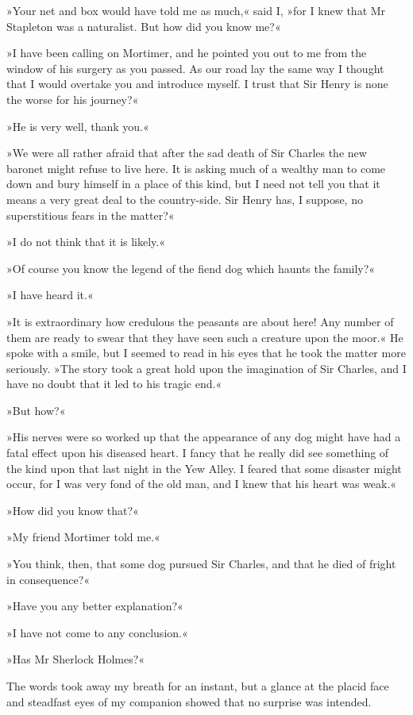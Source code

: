 »Your net and box would have told me as much,« said I, »for I knew that Mr Stapleton was a naturalist. But how did you know me?«

»I have been calling on Mortimer, and he pointed you out to me from the window of his surgery as you passed. As our road lay the same way I thought that I would overtake you and introduce myself. I trust that Sir Henry is none the worse for his journey?«

»He is very well, thank you.«

»We were all rather afraid that after the sad death of Sir Charles the new baronet might refuse to live here. It is asking much of a wealthy man to come down and bury himself in a place of this kind, but I need not tell you that it means a very great deal to the country-side. Sir Henry has, I suppose, no superstitious fears in the matter?«

»I do not think that it is likely.«

»Of course you know the legend of the fiend dog which haunts the family?«

»I have heard it.«

»It is extraordinary how credulous the peasants are about here! Any number of them are ready to swear that they have seen such a creature upon the moor.« He spoke with a smile, but I seemed to read in his eyes that he took the matter more seriously. »The story took a great hold upon the imagination of Sir Charles, and I have no doubt that it led to his tragic end.«

»But how?«

»His nerves were so worked up that the appearance of any dog might have had a fatal effect upon his diseased heart. I fancy that he really did see something of the kind upon that last night in the Yew Alley. I feared that some disaster might occur, for I was very fond of the old man, and I knew that his heart was weak.«

»How did you know that?«

»My friend Mortimer told me.«

»You think, then, that some dog pursued Sir Charles, and that he died of fright in consequence?«

»Have you any better explanation?«

»I have not come to any conclusion.«

»Has Mr Sherlock Holmes?«

The words took away my breath for an instant, but a glance at the placid face and steadfast eyes of my companion showed that no surprise was intended.

